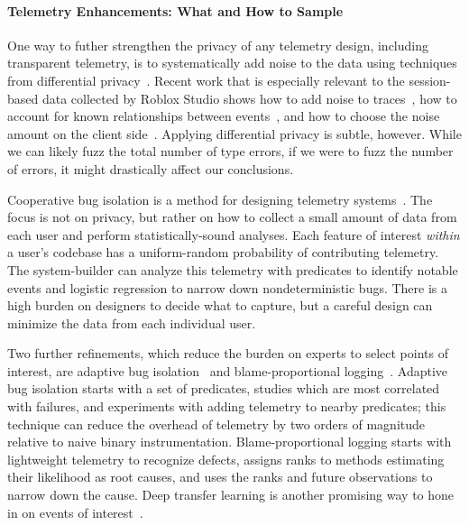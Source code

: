 \documentclass[english,submission,cleveref]{programming}
\begin{document}
\paragraph{Telemetry Enhancements: What and How to Sample}

One way to futher strengthen the privacy of any telemetry design, including
transparent telemetry, is to systematically add noise to the data using
techniques from differential
privacy~\cite{zhlbr-cc-2020,epk-ccs-2014,wblj-usenix-2017}.
Recent work that is especially relevant to the session-based data collected
by Roblox Studio shows how to add noise to traces~\cite{zhlbr-cc-2020},
how to account for known relationships between events~\cite{zhlbr-oopsla-2020},
and how to choose the noise amount on the client side~\cite{hlzbr-ecoop-2021}.
Applying differential privacy is subtle, however.
While we can likely fuzz the total number of type errors, if we were to
fuzz the number of  errors, it might drastically
affect our conclusions.

Cooperative bug isolation is a method for designing
telemetry systems~\cite{liblit-thesis}.
The focus is not on privacy, but rather on how to collect a small amount of
data from each user and perform statistically-sound analyses.
Each feature of interest \emph{within} a user's codebase has a uniform-random
probability of contributing telemetry.
The system-builder can analyze this telemetry with predicates to identify
notable events and logistic regression to narrow down nondeterministic bugs.
There is a high burden on designers to decide what to capture,
but a careful design can minimize the data from each individual user.

Two further refinements, which reduce the burden on experts to
select points of interest, are adaptive bug isolation~\cite{nl-icse-2010}
and blame-proportional logging~\cite{lnsmc-usenix-2018}.
Adaptive bug isolation starts with a set of predicates, studies which are
most correlated with failures, and experiments with adding telemetry to nearby
predicates; this technique can reduce the overhead of telemetry by two orders
of magnitude relative to naive binary instrumentation.
Blame-proportional logging starts with lightweight telemetry to recognize
defects, assigns ranks to methods estimating their likelihood as root causes,
and uses the ranks and future observations to narrow down the cause.
Deep transfer learning is another promising way to hone in on events of
interest~\cite{zfstt-ieeesensors-2022}.
\end{document}
